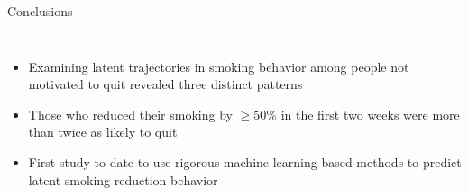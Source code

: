 \documentclass[aspectratio=169]{beamer}
\begin{document}
\begin{frame}{Conclusions}
	\begin{columns}
		\begin{itemize}
			\item<1-> Examining latent trajectories in smoking behavior among people not motivated to quit revealed three distinct patterns
			\item<2-> Those who reduced their smoking by $\geq 50\%$ in the first two weeks were more than twice as likely to quit
			\item <3-> First study to date to use rigorous machine learning-based methods to predict latent smoking reduction behavior
		\end{itemize}

	\end{columns}
\end{frame}




\end{document}
